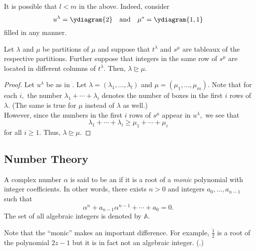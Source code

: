 \begin{rem}
	It is possible that $l < m$ in the above. Indeed, consider
	\begin{equation*} 
		u^\lambda = \ydiagram{2} \andd \mu^s = \ydiagram{1, 1}
	\end{equation*}
	filled in any manner.
\end{rem}

\begin{lem} \label{lem:domlemma}
	Let $\lambda$ and $\mu$ be partitions of $\mu$ and suppose that $t^\lambda$ and $s^\mu$ are tableaux of the respective partitions. Further suppose that integers in the same row of $s^\mu$ are located in different columns of $t^\lambda.$ Then, $\lambda \unrhd \mu.$
\end{lem}
\begin{proof} 
	Let $u^\lambda$ be as in . Let $\lambda = (\lambda_1, \ldots, \lambda_l)$ and $\mu = (\mu_1, \ldots, \mu_m).$ Note that for each $i,$ the number $\lambda_1 + \cdots + \lambda_i$ denotes the number of boxes in the first $i$ rows of $\lambda.$ (The same is true for $\mu$ instead of $\lambda$ as well.)\\
	However, since the numbers in the first $i$ rows of $s^\mu$ appear in $u^\lambda,$ we see that
	\begin{equation*} 
		\lambda_1 + \cdots + \lambda_i \ge \mu_1 + \cdots + \mu_i
	\end{equation*}
	for all $i \ge 1.$ Thus, $\lambda \unrhd \mu.$
\end{proof}

\subsection{Number Theory} \label{subsec:numbertheory}
\begin{defn}%
	\label{defn:alginteger}
	A complex number $\alpha$ is said to be an  if it is a root of a \emph{monic} polynomial with integer coefficients. In other words, there exists $n > 0$ and integers $a_0, \ldots, a_{n - 1}$ such that
	\begin{equation*} 
		\alpha^n + a_{n - 1}\alpha^{n - 1} + \cdots + a_0 = 0.
	\end{equation*}
	The set of all algebraic integers is denoted by $\mathbb{A}.$
\end{defn}

\begin{ex}
	Note that the ``monic'' makes an important difference. For example, $\frac{1}{2}$ is a root of the polynomial $2z - 1$ but it is in fact not an algebraic integer. (.)
\end{ex}

